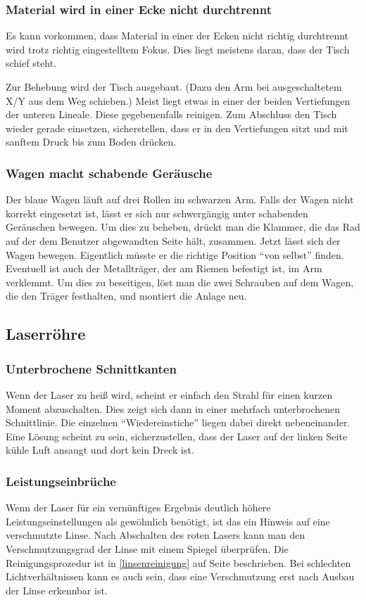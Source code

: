 \documentclass{\basedir/fablab-document}
\begin{document}
	\subsubsection{Material wird in einer Ecke nicht durchtrennt}
	Es kann vorkommen, dass Material in einer der Ecken nicht richtig durchtrennt wird trotz richtig eingestelltem Fokus. Dies liegt meistens daran, dass der Tisch schief steht.

	Zur Behebung wird der Tisch ausgebaut. (Dazu den Arm bei ausgeschaltetem X/Y aus dem Weg schieben.) Meist liegt etwas in einer der beiden Vertiefungen der unteren Lineale. Diese gegebenenfalls reinigen. Zum Abschluss den Tisch wieder gerade einsetzen, sicherstellen, dass er in den Vertiefungen sitzt und mit sanftem Druck bis zum Boden drücken.

	\subsubsection{Wagen macht schabende Geräusche}
	Der blaue Wagen läuft auf drei Rollen im schwarzen Arm. Falls der Wagen nicht korrekt eingesetzt ist, lässt er sich nur schwergängig unter schabenden Geräuschen bewegen. Um dies zu beheben, drückt man die Klammer, die das Rad auf der dem Benutzer abgewandten Seite hält, zusammen. Jetzt lässt sich der Wagen bewegen. Eigentlich müsste er die richtige Position \enquote{von selbst} finden. Eventuell ist auch der Metallträger, der am Riemen befestigt ist, im Arm verklemmt. Um dies zu beseitigen, löst man die zwei Schrauben auf dem Wagen, die den Träger festhalten, und montiert die Anlage neu.

	\subsection{Laserröhre}
	\subsubsection{Unterbrochene Schnittkanten}
	Wenn der Laser zu heiß wird, scheint er einfach den Strahl für einen kurzen Moment abzuschalten. Dies zeigt sich dann in einer mehrfach unterbrochenen Schnittlinie. Die einzelnen \enquote{Wiedereinstiche} liegen dabei direkt nebeneinander. Eine Lösung scheint zu sein, sicherzustellen, dass der Laser auf der linken Seite kühle Luft ansaugt und dort kein Dreck ist.
	\subsubsection{Leistungseinbrüche}
	Wenn der Laser für ein vernünftiges Ergebnis deutlich höhere Leistungseinstellungen als gewöhnlich benötigt, ist das ein Hinweis auf eine verschmutzte Linse. Nach Abschalten des roten Lasers kann man den Verschmutzungsgrad der Linse mit einem Spiegel überprüfen. Die Reinigungsprozedur ist in \cref{linsenreinigung} auf Seite \pageref{linsenreinigung} beschrieben. Bei schlechten Lichtverhältnissen kann es auch sein, dass eine Verschmutzung erst nach Ausbau der Linse erkennbar ist.
\end{document}
